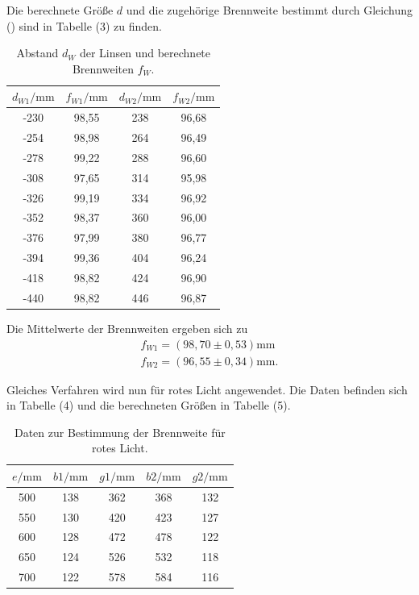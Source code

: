 Die berechnete Größe $d$ und die zugehörige Brennweite bestimmt durch Gleichung () sind in Tabelle (3) zu finden.
\begin{table}[H]
\centering
\caption{Abstand $d_W$ der Linsen und berechnete Brennweiten $f_W$.}
\label{tab:einzel1}
\begin{tabular}{c c c c}
\toprule
$d_{W1}/\si{\milli\meter}$ & $f_{W1}/\si{\milli\meter}$ & $d_{W2}/\si{\milli\meter}$ & $f_{W2}/\si{\milli\meter}$ \\
\midrule
-230 & 98,55 & 238 & 96,68\\
-254 & 98,98 & 264 & 96,49\\
-278 & 99,22 & 288 & 96,60\\
-308 & 97,65 & 314 & 95,98\\
-326 & 99,19 & 334 & 96,92\\
-352 & 98,37 & 360 & 96,00\\
-376 & 97,99 & 380 & 96,77\\
-394 & 99,36 & 404 & 96,24\\
-418 & 98,82 & 424 & 96,90\\
-440 & 98,82 & 446 & 96,87\\
\bottomrule
\end{tabular}
\end{table}

Die Mittelwerte der Brennweiten ergeben sich zu
\begin{align*}
f_{W1} = (98,70 \pm 0,53) \si{\milli\meter} \\
f_{W2} = (96,55 \pm 0,34) \si{\milli\meter} .
\end{align*}


Gleiches Verfahren wird nun für rotes Licht angewendet. Die Daten befinden sich in Tabelle (4) und die berechneten Größen in Tabelle (5).


\begin{table}[H]
\centering
\caption{Daten zur Bestimmung der Brennweite für rotes Licht.}
\label{tab:einzel1}
\begin{tabular}{c c c c c}
\toprule
$e/\si{\milli\meter}$ &$b1/\si{\milli\meter}$ & $g1/\si{\milli\meter}$ & $b2/\si{\milli\meter}$ & $g2/\si{\milli\meter}$ \\
\midrule
500 &138 & 362 & 368 & 132\\
550 &130 & 420 & 423 & 127\\
600 &128 & 472 & 478 & 122\\
650 &124 & 526 & 532 & 118\\
700 &122 & 578 & 584 & 116\\
\bottomrule
\end{tabular}
\end{table}

